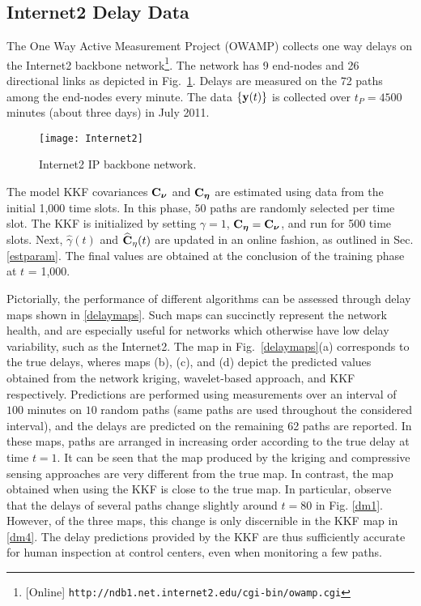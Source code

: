 \documentclass[draftcls,onecolumn,12pt]{IEEEtran}
\newlength \figwidth
\def \yt {{\b{y}(t)}}
\def \ceta {{\b{C}_{\bs{\eta}}}}
\def \cnu {{\b{C}_{\bs{\nu}}}}
\theoremstyle{plain}\newtheorem{thm}{Theorem}
\theoremstyle{definition}
\theoremstyle{remark}
\begin{document}
\subsection{Internet2 Delay Data}
The One Way Active Measurement Project (OWAMP) collects one way delays on the Internet2 backbone network\footnote{[Online] \texttt{http://ndb1.net.internet2.edu/cgi-bin/owamp.cgi}}. 
The network has 9 end-nodes and 26 directional links as depicted in Fig.~\ref{Internet2}.  Delays are measured on the 72 paths among the end-nodes every minute. The data $\{\yt\}$ is collected over $t_P = 4500$ minutes (about three days) in July 2011.
\begin{figure}[t]
  \centering
  \texttt{[image: Internet2]}
  \vspace{-.5cm}
  \caption{Internet2 IP backbone network.}
  \label{Internet2}
\end{figure}

The model KKF covariances $\cnu$ and $\ceta$ are estimated using data from the initial 1,000 time slots. In this phase, $50$ paths are randomly selected per time slot. The KKF is initialized by setting $\gamma = 1$, $\ceta = \cnu$, and run for 500 time slots. Next, $\hat{\gamma}(t)$ and $\widehat{\mathbf{C}}_{\mathbf{\eta}}(t)$ are updated in an online fashion, as outlined in Sec. \ref{estparam}. The final values are obtained at the conclusion of the training phase at $t$ = 1,000. 

Pictorially, the performance of different algorithms can be assessed through delay maps shown in \ref{delaymaps}. 
Such maps can succinctly represent the network health, and are especially useful for networks which otherwise have low delay variability, such as the Internet2. 
The map in Fig.~\ref{delaymaps}(a) corresponds to the true delays, wheres maps (b), (c), and (d) depict the predicted values obtained from the network kriging, wavelet-based approach, and KKF respectively. 
Predictions are performed using measurements over an interval of $100$ minutes on $10$ random paths (same paths are used throughout the considered interval), and the delays are predicted on the remaining 62 paths are reported. 
In these maps, paths are arranged in increasing order according to the true delay at time $t=1$.
It can be seen that the map produced by the kriging and compressive sensing approaches are very different from the true map.
In contrast, the map obtained when using the KKF is close to the true map. 
In particular, observe that the delays of several paths change slightly around $t=80$ in Fig. \ref{dm1}.
However, of the three maps, this change is only discernible in the KKF map in \ref{dm4}. 
The delay predictions provided by the KKF are thus sufficiently accurate for human inspection at control centers, even when monitoring a few paths. 
\end{document}

